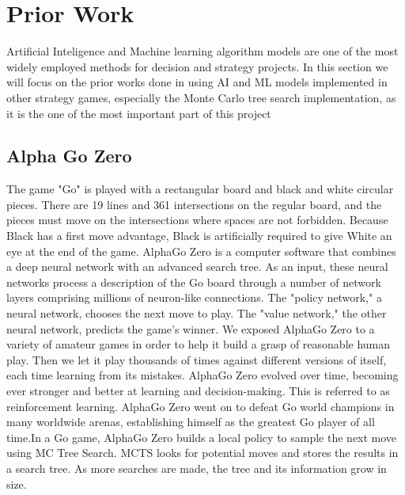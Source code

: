 \documentclass[10pt,twocolumn]{article}
\begin{document}
\section{Prior Work}
    Artificial Inteligence and Machine learning algorithm models are one of the most widely employed methods for decision and strategy projects. In this section we will focus on the prior works done in using AI and ML models implemented in other strategy games, especially the Monte Carlo tree search implementation, as it is the one of the most important part of this project 
\subsection{Alpha Go Zero}
    The game "Go" is played with a rectangular board and black and white circular pieces. There are 19 lines and 361 intersections on the regular board, and the pieces must move on the intersections where spaces are not forbidden. Because Black has a first move advantage, Black is artificially required to give White an eye at the end of the game. AlphaGo Zero is a computer software that combines a deep neural network with an advanced search tree. As an input, these neural networks process a description of the Go board through a number of network layers comprising millions of neuron-like connections. The "policy network," a neural network, chooses the next move to play. The "value network," the other neural network, predicts the game's winner. We exposed AlphaGo Zero to a variety of amateur games in order to help it build a grasp of reasonable human play. Then we let it play thousands of times against different versions of itself, each time learning from its mistakes. AlphaGo Zero evolved over time, becoming ever stronger and better at learning and decision-making. This is referred to as reinforcement learning. AlphaGo Zero went on to defeat Go world champions in many worldwide arenas, establishing himself as the greatest Go player of all time.In a Go game, AlphaGo Zero builds a local policy to sample the next move using MC Tree Search. MCTS looks for potential moves and stores the results in a search tree. As more searches are made, the tree and its information grow in size. \cite{Surag}
    
    
\end{document}
